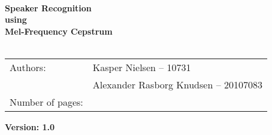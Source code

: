 \documentclass[Main]{subfiles}
\begin{document}
\begin{center}



\HRule \\[0.4cm]

{ \huge \bfseries Speaker Recognition}\\[0.4cm]
{ \huge \bfseries using}\\[0.4cm] 
{ \huge \bfseries Mel-Frequency Cepstrum}\\[0.4cm]

\HRule \\[1.5cm]


\begin{tabular}{p{}|p{}}
\hline 
Authors: & Kasper Nielsen -- 10731\\ & Alexander Rasborg Knudsen -- 20107083 \\
\hline 
Number of pages: & \pageref{LastPage} \\
\hline 
\end{tabular} 

\bigskip

\textbf{\Large Version: 1.0}\\

\end{center}
\end{document}
